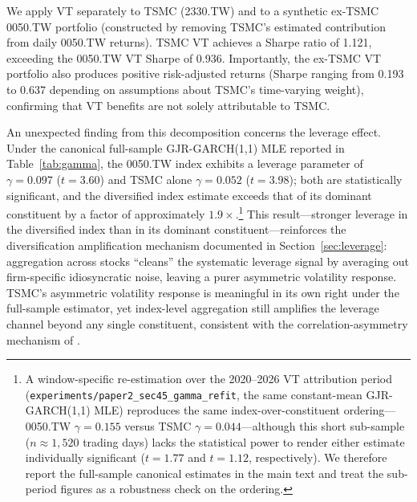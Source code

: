 We apply VT separately to TSMC (2330.TW) and to a synthetic ex-TSMC 0050.TW portfolio (constructed by removing TSMC's estimated contribution from daily 0050.TW returns). TSMC VT achieves a Sharpe ratio of 1.121, exceeding the 0050.TW VT Sharpe of 0.936. Importantly, the ex-TSMC VT portfolio also produces positive risk-adjusted returns (Sharpe ranging from 0.193 to 0.637 depending on assumptions about TSMC's time-varying weight), confirming that VT benefits are not solely attributable to TSMC.

An unexpected finding from this decomposition concerns the leverage effect. Under the canonical full-sample GJR-GARCH(1,1) MLE reported in Table~\ref{tab:gamma}, the 0050.TW index exhibits a leverage parameter of $\gamma = 0.097$ ($t = 3.60$) and TSMC alone $\gamma = 0.052$ ($t = 3.98$); both are statistically significant, and the diversified index estimate exceeds that of its dominant constituent by a factor of approximately $1.9\times$.\footnote{A window-specific re-estimation over the 2020--2026 VT attribution period (\texttt{experiments/paper2\_sec45\_gamma\_refit}, the same constant-mean GJR-GARCH(1,1) MLE) reproduces the same index-over-constituent ordering---0050.TW $\gamma = 0.155$ versus TSMC $\gamma = 0.044$---although this short sub-sample ($n \approx 1{,}520$ trading days) lacks the statistical power to render either estimate individually significant ($t = 1.77$ and $t = 1.12$, respectively). We therefore report the full-sample canonical estimates in the main text and treat the sub-period figures as a robustness check on the ordering.} This result---stronger leverage in the diversified index than in its dominant constituent---reinforces the diversification amplification mechanism documented in Section~\ref{sec:leverage}: aggregation across stocks ``cleans'' the systematic leverage signal by averaging out firm-specific idiosyncratic noise, leaving a purer asymmetric volatility response. TSMC's asymmetric volatility response is meaningful in its own right under the full-sample estimator, yet index-level aggregation still amplifies the leverage channel beyond any single constituent, consistent with the correlation-asymmetry mechanism of \citet{ang2002}.


